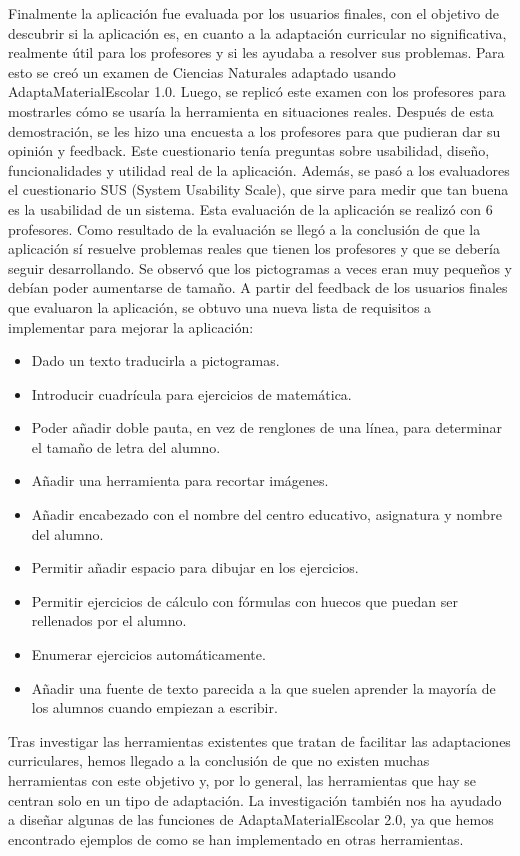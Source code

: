 Finalmente la aplicación fue evaluada por los usuarios finales, con el objetivo de descubrir si la aplicación es, en cuanto a la adaptación curricular no significativa, realmente útil para los profesores y si les ayudaba a resolver sus problemas. Para esto se creó un examen de Ciencias Naturales adaptado usando AdaptaMaterialEscolar 1.0. Luego, se replicó este examen con los profesores para mostrarles cómo se usaría la herramienta en situaciones reales. Después de esta demostración, se les hizo una encuesta a los profesores para que pudieran dar su opinión y feedback. Este cuestionario tenía preguntas sobre usabilidad, diseño, funcionalidades y utilidad real de la aplicación. Además, se pasó a los evaluadores el cuestionario SUS (System Usability Scale), que sirve para medir que tan buena es la usabilidad de un sistema. Esta evaluación de la aplicación se realizó con 6 profesores. Como resultado de la evaluación se llegó a la conclusión de que la aplicación sí resuelve problemas reales que tienen los profesores y que se debería seguir desarrollando. Se observó que los pictogramas a veces eran muy pequeños y debían poder aumentarse de tamaño.
A partir del feedback de los usuarios finales que evaluaron la aplicación, se obtuvo una nueva lista de requisitos a implementar para mejorar la aplicación:

\begin{itemize}
    \item Dado un texto traducirla a pictogramas.
    \item Introducir cuadrícula para ejercicios de matemática.
    \item Poder añadir doble pauta, en vez de renglones de una línea, para determinar el tamaño de letra del alumno.
    \item Añadir una herramienta para recortar imágenes.
    \item Añadir encabezado con el nombre del centro educativo, asignatura y nombre del alumno.
    \item Permitir añadir espacio para dibujar en los ejercicios.
    \item Permitir ejercicios de cálculo con fórmulas con huecos que puedan ser rellenados por el alumno.
    \item Enumerar ejercicios automáticamente.
    \item Añadir una fuente de texto parecida a la que suelen aprender la mayoría de los alumnos cuando empiezan a escribir.
\end{itemize}


Tras investigar las herramientas existentes que tratan de facilitar las adaptaciones curriculares, hemos llegado a la conclusión de que no existen muchas herramientas con este objetivo y, por lo general, las herramientas que hay se centran solo en un tipo de adaptación. La investigación también nos ha ayudado a diseñar algunas de las funciones de AdaptaMaterialEscolar 2.0, ya que hemos encontrado ejemplos de como se han implementado en otras herramientas.
